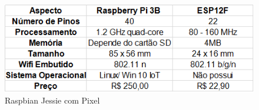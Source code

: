\begin{figure}[htb]
	\caption{\label{fig-raspbian-jessie}Raspbian Jessie com Pixel}
	\begin{center}
		\includegraphics[width=1\textwidth]{040-plataformas/Plataformas DIY e comparacao/rpi-esp.png}
	\end{center}
\end{figure}

